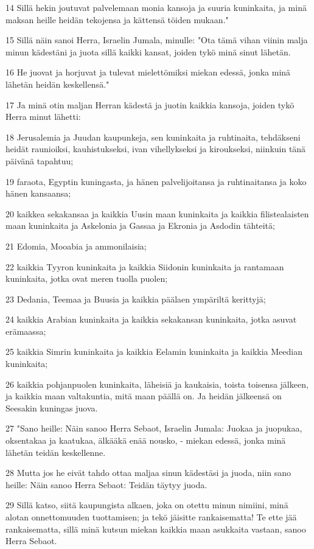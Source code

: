 \par 14 Sillä hekin joutuvat palvelemaan monia kansoja ja suuria kuninkaita, ja minä maksan heille heidän tekojensa ja kättensä töiden mukaan."
\par 15 Sillä näin sanoi Herra, Israelin Jumala, minulle: "Ota tämä vihan viinin malja minun kädestäni ja juota sillä kaikki kansat, joiden tykö minä sinut lähetän.
\par 16 He juovat ja horjuvat ja tulevat mielettömiksi miekan edessä, jonka minä lähetän heidän keskellensä."
\par 17 Ja minä otin maljan Herran kädestä ja juotin kaikkia kansoja, joiden tykö Herra minut lähetti:
\par 18 Jerusalemia ja Juudan kaupunkeja, sen kuninkaita ja ruhtinaita, tehdäkseni heidät raunioiksi, kauhistukseksi, ivan vihellykseksi ja kiroukseksi, niinkuin tänä päivänä tapahtuu;
\par 19 faraota, Egyptin kuningasta, ja hänen palvelijoitansa ja ruhtinaitansa ja koko hänen kansaansa;
\par 20 kaikkea sekakansaa ja kaikkia Uusin maan kuninkaita ja kaikkia filistealaisten maan kuninkaita ja Askelonia ja Gassaa ja Ekronia ja Asdodin tähteitä;
\par 21 Edomia, Mooabia ja ammonilaisia;
\par 22 kaikkia Tyyron kuninkaita ja kaikkia Siidonin kuninkaita ja rantamaan kuninkaita, jotka ovat meren tuolla puolen;
\par 23 Dedania, Teemaa ja Buusia ja kaikkia päälaen ympäriltä kerittyjä;
\par 24 kaikkia Arabian kuninkaita ja kaikkia sekakansan kuninkaita, jotka asuvat erämaassa;
\par 25 kaikkia Simrin kuninkaita ja kaikkia Eelamin kuninkaita ja kaikkia Meedian kuninkaita;
\par 26 kaikkia pohjanpuolen kuninkaita, läheisiä ja kaukaisia, toista toisensa jälkeen, ja kaikkia maan valtakuntia, mitä maan päällä on. Ja heidän jälkeensä on Seesakin kuningas juova.
\par 27 "Sano heille: Näin sanoo Herra Sebaot, Israelin Jumala: Juokaa ja juopukaa, oksentakaa ja kaatukaa, älkääkä enää nousko, - miekan edessä, jonka minä lähetän teidän keskellenne.
\par 28 Mutta jos he eivät tahdo ottaa maljaa sinun kädestäsi ja juoda, niin sano heille: Näin sanoo Herra Sebaot: Teidän täytyy juoda.
\par 29 Sillä katso, siitä kaupungista alkaen, joka on otettu minun nimiini, minä alotan onnettomuuden tuottamisen; ja tekö jäisitte rankaisematta! Te ette jää rankaisematta, sillä minä kutsun miekan kaikkia maan asukkaita vastaan, sanoo Herra Sebaot.
